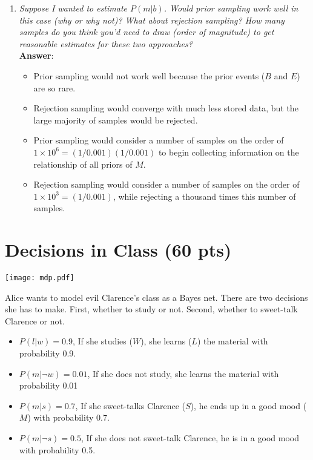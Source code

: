 \documentclass[fleqn]{hw7}
\begin{document}
\begin{enumerate}
\item \textit{Suppose I wanted to estimate \(P(m | b)\). Would prior sampling work well in this case (why or why not)? What about rejection sampling? How many samples do you think you'd need to draw (order of magnitude) to get reasonable estimates for these two approaches?}\\
\textbf{Answer}: 
\begin{itemize}
	\item Prior sampling would not work well because the prior events ($B$ and $E$) are so rare.
	\item Rejection sampling would converge with much less stored data, but the large majority of samples would be rejected.
	\item Prior sampling would consider a number of samples on the order of $1\times10^{6} = (1/0.001)(1/0.001)$ to begin collecting information on the relationship of all priors of $M$.
	\item Rejection sampling would consider a number of samples on the order of $1\times10^{3} = (1/0.001)$, while rejecting a thousand times this number of samples.
\end{itemize}


 

\end{enumerate}

\section{Decisions in Class (60 pts)}

\texttt{[image: mdp.pdf]}

Alice wants to model evil Clarence's  class as a Bayes net. There are two decisions she has to make. First, whether to study or not. Second, whether to sweet-talk Clarence or not. 
\begin{itemize}
	\item $ P(l|w) = 0.9 $, If she studies ($W$), she learns ($L$) the material with probability 0.9.
	\item $ P(m|\neg w) = 0.01 $, If she does not study, she learns the material with probability 0.01
	\item $ P(m|s) = 0.7 $, If she sweet-talks Clarence ($S$), he ends up in a good mood ($M$) with probability 0.7.
	\item $ P(m|\neg s) = 0.5 $, If she does not sweet-talk Clarence, he is in a good mood with probability 0.5.
\end{itemize}
\end{document}
